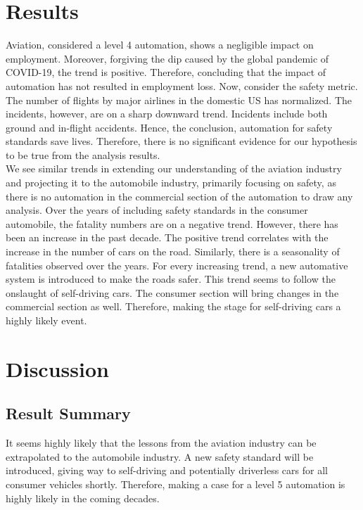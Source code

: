 \documentclass[
  man,floatsintext]{apa7}
\begin{document}
\hypertarget{results}{%
\section{Results}\label{results}}

Aviation, considered a level 4 automation, shows a negligible impact on employment. Moreover, forgiving the dip caused by the global pandemic of COVID-19, the trend is positive. Therefore, concluding that the impact of automation has not resulted in employment loss. Now, consider the safety metric. The number of flights by major airlines in the domestic US has normalized. The incidents, however, are on a sharp downward trend. Incidents include both ground and in-flight accidents. Hence, the conclusion, automation for safety standards save lives. Therefore, there is no significant evidence for our hypothesis to be true from the analysis results.\\

We see similar trends in extending our understanding of the aviation industry and projecting it to the automobile industry, primarily focusing on safety, as there is no automation in the commercial section of the automation to draw any analysis. Over the years of including safety standards in the consumer automobile, the fatality numbers are on a negative trend. However, there has been an increase in the past decade. The positive trend correlates with the increase in the number of cars on the road. Similarly, there is a seasonality of fatalities observed over the years. For every increasing trend, a new automative system is introduced to make the roads safer. This trend seems to follow the onslaught of self-driving cars. The consumer section will bring changes in the commercial section as well. Therefore, making the stage for self-driving cars a highly likely event.

\hypertarget{discussion}{%
\section{Discussion}\label{discussion}}

\hypertarget{result-summary}{%
\subsection{Result Summary}\label{result-summary}}

It seems highly likely that the lessons from the aviation industry can be extrapolated to the automobile industry. A new safety standard will be introduced, giving way to self-driving and potentially driverless cars for all consumer vehicles shortly. Therefore, making a case for a level 5 automation is highly likely in the coming decades.\\
\end{document}
